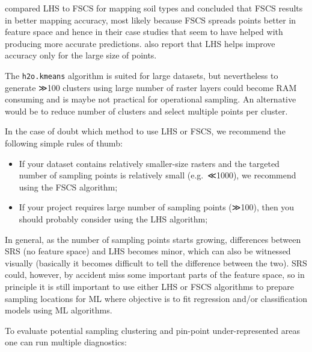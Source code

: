 \documentclass[
  graybox,natbib,nospthms]{svmono}
\providecommand{\tightlist}{%
  \setlength{\itemsep}{0pt}\setlength{\parskip}{0pt}}
\providecommand{\tightlist}{\setlength{\itemsep}{0pt}\setlength{\parskip}{0pt}}
\begin{document}
\citet{ma2020comparison} compared LHS to FSCS for mapping soil types and concluded that
FSCS results in better mapping accuracy, most likely because FSCS spreads points
better in feature space and hence in their case studies that seem to have helped
with producing more accurate predictions. \citet{yang2020evaluation} also report that
LHS helps improve accuracy only for the large size of points.

The \texttt{h2o.kmeans} algorithm is suited for large datasets, but nevertheless to
generate ≫100 clusters using large number of raster layers could become RAM
consuming and is maybe not practical for operational sampling. An alternative
would be to reduce number of clusters and select multiple points per cluster.

In the case of doubt which method to use LHS or FSCS, we recommend the following
simple rules of thumb:

\begin{itemize}
\tightlist
\item
  If your dataset contains relatively smaller-size rasters and the targeted number of sampling
  points is relatively small (e.g.~≪1000), we recommend using the FSCS algorithm;\\
\item
  If your project requires large number of sampling points (≫100), then you should probably
  consider using the LHS algorithm;
\end{itemize}

In general, as the number of sampling points starts growing, differences between
SRS (no feature space) and LHS becomes minor, which can also be witnessed
visually (basically it becomes difficult to tell the difference between the two).
SRS could, however, by accident miss some important parts of the feature space,
so in principle it is still important to use either LHS or FSCS algorithms to
prepare sampling locations for ML where objective is to fit regression and/or
classification models using ML algorithms.

To evaluate potential sampling clustering and pin-point under-represented areas
one can run multiple diagnostics:
\end{document}
